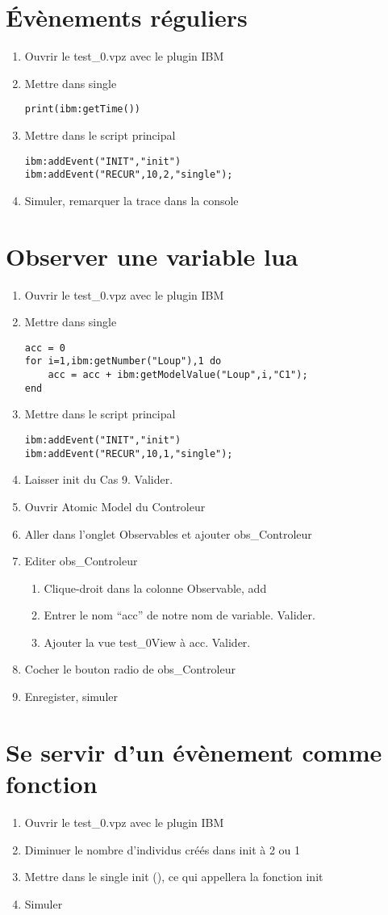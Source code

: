 \documentclass[a4paper,11pt,final]{article}
\begin{document}
\section{Évènements réguliers}
\begin{enumerate}
	\item Ouvrir le test\_0.vpz avec le plugin IBM 
	\item Mettre dans single
	\begin{lstlisting}[frame=single]
print(ibm:getTime())
		\end{lstlisting} 
	\item Mettre dans le script principal
	\begin{lstlisting}[frame=single]
ibm:addEvent("INIT","init")
ibm:addEvent("RECUR",10,2,"single");
		\end{lstlisting}
	\item Simuler, remarquer la trace dans la console
\end{enumerate}

\section{Observer une variable lua}
\begin{enumerate}
	\item Ouvrir le test\_0.vpz avec le plugin IBM 
	\item Mettre dans single
	\begin{lstlisting}[frame=single]
acc = 0
for i=1,ibm:getNumber("Loup"),1 do
	acc = acc + ibm:getModelValue("Loup",i,"C1");
end
		\end{lstlisting} 
	\item Mettre dans le script principal
	\begin{lstlisting}[frame=single]
ibm:addEvent("INIT","init")
ibm:addEvent("RECUR",10,1,"single");
		\end{lstlisting} 
	\item Laisser init du Cas 9. Valider.
	\item Ouvrir Atomic Model du Controleur
	\item Aller dans l'onglet Observables et ajouter obs\_Controleur
	\item Editer obs\_Controleur
	\begin{enumerate}
		\item Clique-droit dans la colonne Observable, add
		\item Entrer le nom ``acc'' de notre nom de variable. Valider.
		\item Ajouter la vue test\_0View à acc. Valider.
	\end{enumerate}
	\item Cocher le bouton radio de obs\_Controleur
	\item Enregister, simuler
\end{enumerate}

\section{Se servir d'un évènement comme fonction}
\begin{enumerate}
	\item Ouvrir le test\_0.vpz avec le plugin IBM 
	\item Diminuer le nombre d'individus créés dans init à 2 ou 1
	\item Mettre dans le single init (), ce qui appellera la fonction init
	\item Simuler
\end{enumerate}
\end{document}
